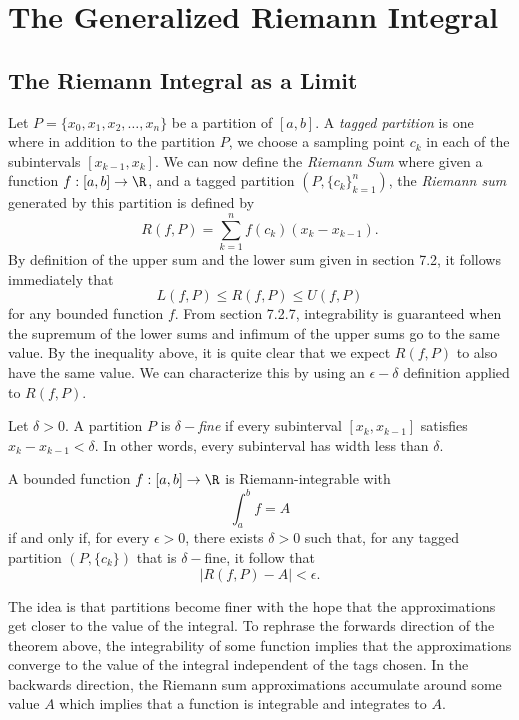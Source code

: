 \section{The Generalized Riemann Integral}

\subsection{The Riemann Integral as a Limit}

Let \( P = \{ x_{0}, x_{1}, x_{2}, \dots, x_{n} \}  \) be a partition of \( [a,b]  \). A \textit{tagged partition} is one where in addition to the partition \( P \), we choose a sampling point \( c_{k }  \) in each of the subintervals \( [x_{k-1}, x_{k }]  \). We can now define the \textit{Riemann Sum} where given a function \( f: [a,b] \to \R  \), and a tagged partition \( (P , \{ c_{k }  \} _{k=1}^{n}  ) \), the \textit{Riemann sum} generated by this partition is defined by 
\[  R(f,P ) = \sum_{ k=1 }^{ n } f(c_{k }) (x_{k } - x_{k-1}). \]
By definition of the upper sum and the lower sum given in section 7.2, it follows immediately that 
\[  L(f,P) \leq R(f,P) \leq U(f,P)   \] for any bounded function \( f  \). From section 7.2.7, integrability is guaranteed when the supremum of the lower sums and infimum of the upper sums go to the same value. By the inequality above, it is quite clear that we expect \( R(f,P ) \) to also have the same value. We can characterize this by using an \( \epsilon - \delta   \) definition applied to \( R(f,P)  \).
\begin{tcolorbox}
\begin{defn}
    Let \( \delta > 0   \). A partition \( P  \) is \( \delta- \)\textit{fine} if every subinterval \( [x_{k }, x_{k-1} ]  \) satisfies \( x_{k } - x_{k-1} <  \delta  \). In other words, every subinterval has width less than \( \delta  \).
\end{defn}
\end{tcolorbox}

\begin{tcolorbox}
    \begin{thm}
    A bounded function \( f: [a,b] \to \R  \) is Riemann-integrable with 
    \[  \int_{ a }^{ b } f  = A  \] if and only if, for every \( \epsilon > 0 \), there exists \( \delta > 0  \) such that, for any tagged partition \( (P, \{ c_{k } \} ) \) that is \( \delta- \)fine, it follow that 
    \[  | R(f,P) - A  | < \epsilon. \]
    \end{thm}
\end{tcolorbox}

The idea is that partitions become finer with the hope that the approximations get closer to the value of the integral. To rephrase the forwards direction of the theorem above, the integrability of some function implies that the approximations converge to the value of the integral independent of the tags chosen. In the backwards direction, the Riemann sum approximations accumulate around some value \( A  \) which implies that a function is integrable and integrates to \( A  \). 




